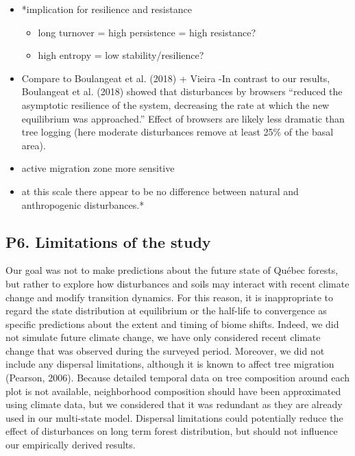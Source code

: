 \documentclass[a4paperpaper,]{article}
\providecommand{\tightlist}{%
  \setlength{\itemsep}{0pt}\setlength{\parskip}{0pt}}
\begin{document}
\begin{itemize}
\item
  *implication for resilience and resistance

  \begin{itemize}
  \tightlist
  \item
    long turnover = high persistence = high resistance?
  \item
    high entropy = low stability/resilience?
  \end{itemize}
\item
  Compare to Boulangeat et al. (2018) + Vieira -In contrast to our
  results, Boulangeat et al. (2018) showed that disturbances by browsers
  ``reduced the asymptotic resilience of the system, decreasing the rate
  at which the new equilibrium was approached.'' Effect of browsers are
  likely less dramatic than tree logging (here moderate disturbances
  remove at least 25\% of the basal area).
\item
  active migration zone more sensitive
\item
  at this scale there appear to be no difference between natural and
  anthropogenic disturbances.*
\end{itemize}

\hypertarget{p6.-limitations-of-the-study}{%
\subsection{P6. Limitations of the
study}\label{p6.-limitations-of-the-study}}

Our goal was not to make predictions about the future state of Québec
forests, but rather to explore how disturbances and soils may interact
with recent climate change and modify transition dynamics. For this
reason, it is inappropriate to regard the state distribution at
equilibrium or the half-life to convergence as specific predictions
about the extent and timing of biome shifts. Indeed, we did not simulate
future climate change, we have only considered recent climate change
that was observed during the surveyed period. Moreover, we did not
include any dispersal limitations, although it is known to affect tree
migration (Pearson, 2006). Because detailed temporal data on tree
composition around each plot is not available, neighborhood composition
should have been approximated using climate data, but we considered that
it was redundant as they are already used in our multi-state model.
Dispersal limitations could potentially reduce the effect of
disturbances on long term forest distribution, but should not influence
our empirically derived results.
\end{document}
